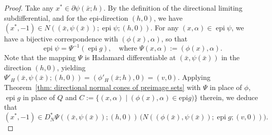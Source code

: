\documentclass[10pt,a4paper]{amsart}
\begin{document}
\begin{proof}
Take any $x^*\in \partial \psi(\bar x; h)$. By the definition of the directional limiting subdifferential, and for the epi-direction $(h, 0)$, we have  
\( (x^*, -1) \in N((\bar{x}, \psi(\bar{x})); \operatorname{epi} \psi; (h, 0)) \).  
For any \( (x, \alpha) \in \operatorname{epi} \psi \), we have a bijective correspondence with \( (\phi(x), \alpha) \), so that
\[
    \operatorname{epi} \psi = \Psi^{-1}(\operatorname{epi} g),
    \quad \text{where } \Psi(x, \alpha) := (\phi(x), \alpha).
\]
Note that the mapping $\Psi$ is Hadamard differentiable at $(\bar{x}, \psi(\bar{x}))$ in the direction $(h, 0)$, yielding $\Psi'_H(\bar{x}, \psi(\bar{x}); (h, 0)) = (\phi'_H(\bar{x}; h), 0) = (v, 0)$.
Applying Theorem~\ref{thm: directional normal cones of preimage sets} with \( \Psi \) in place of \( \phi \), \( \operatorname{epi} g \) in place of \( Q \) and $C:=\{(x,\alpha) \mid (\phi(x),\alpha)\in \text{epi}g)\}$ therein,   
we deduce that
\begin{equation}\label{eq:preimage_chain}
    (x^*, -1) 
    \in D^*_N \Psi((\bar{x},\psi(\bar x)); (h, 0)) \,
    \big( N((\phi(\bar{x}), \psi(\bar{x})); \operatorname{epi} g; (v, 0)) \big).
\end{equation}


\end{proof}
\end{document}
